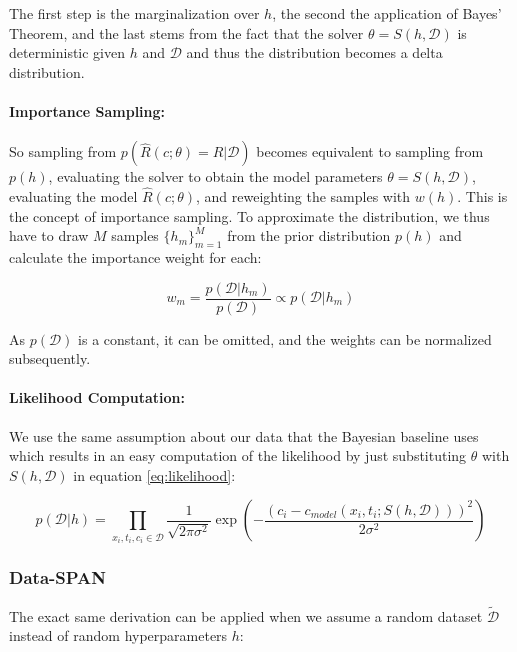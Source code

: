 \documentclass{article}
\begin{document}
The first step is the marginalization over $h$, the second the application of Bayes' Theorem, and the last stems from the fact that the solver $\theta = S(h, \mathcal{D})$ is deterministic given $h$ and $\mathcal{D}$ and thus the distribution becomes a delta distribution.


\paragraph{Importance Sampling:}

So sampling from $p(\hat{R}(c; \theta) = R| \mathcal{D})$ becomes equivalent to sampling from $p(h)$, evaluating the solver to obtain the model parameters $\theta = S(h, \mathcal{D})$, evaluating the model $\hat{R}(c; \theta)$, and reweighting the samples with $w(h)$. This is the concept of importance sampling. To approximate the distribution, we thus have to draw $M$ samples $\{h_m\}_{m=1}^M$ from the prior distribution $p(h)$ and calculate the importance weight for each:

\begin{equation*}
w_m = \frac{p(\mathcal{D} | h_m)}{p(\mathcal{D})} \propto p(\mathcal{D} | h_m)
\end{equation*}

As $p(\mathcal{D})$ is a constant, it can be omitted, and the weights can be normalized subsequently.


\paragraph{Likelihood Computation:}
We use the same assumption about our data that the Bayesian baseline uses which results in an easy computation of the likelihood by just substituting $\theta$ with $S(h, \mathcal{D})$ in equation \eqref{eq:likelihood}:

\begin{equation*}
p(\mathcal{D} | h) = \prod_{x_i, t_i, c_i \in \mathcal{D}} \frac{1}{\sqrt{2\pi \sigma^2}} \exp \left( -\frac{(c_i - c_{model}(x_i, t_i; S(h, \mathcal{D})))^2}{2\sigma^2} \right)
\end{equation*}



\subsubsection{Data-SPAN}
The exact same derivation can be applied when we assume a random dataset $\tilde{\mathcal{D}}$ instead of random hyperparameters $h$:
\end{document}
